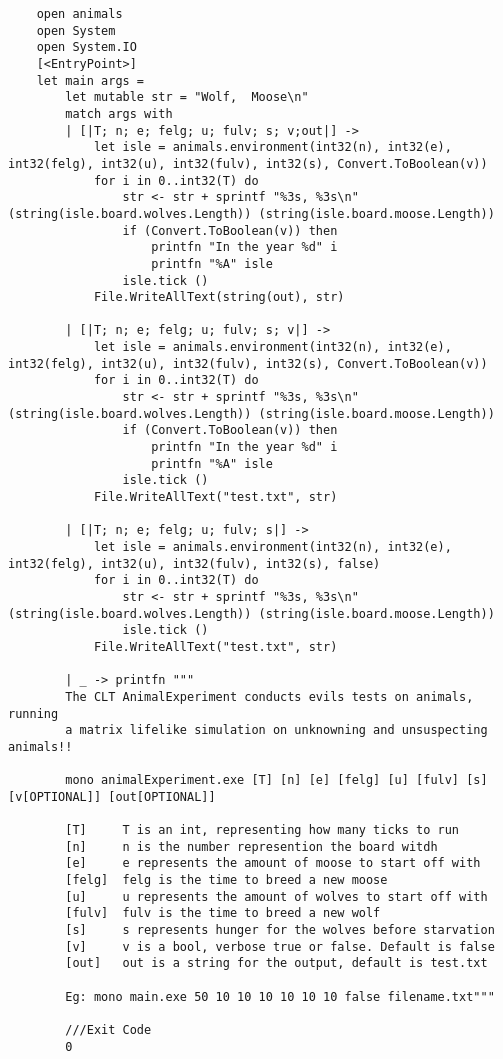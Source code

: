 \begin{lstlisting}
    open animals
    open System
    open System.IO
    [<EntryPoint>]
    let main args =
        let mutable str = "Wolf,  Moose\n"
        match args with
        | [|T; n; e; felg; u; fulv; s; v;out|] ->
            let isle = animals.environment(int32(n), int32(e), int32(felg), int32(u), int32(fulv), int32(s), Convert.ToBoolean(v))
            for i in 0..int32(T) do
                str <- str + sprintf "%3s, %3s\n" (string(isle.board.wolves.Length)) (string(isle.board.moose.Length))
                if (Convert.ToBoolean(v)) then
                    printfn "In the year %d" i
                    printfn "%A" isle
                isle.tick ()
            File.WriteAllText(string(out), str)
        
        | [|T; n; e; felg; u; fulv; s; v|] ->
            let isle = animals.environment(int32(n), int32(e), int32(felg), int32(u), int32(fulv), int32(s), Convert.ToBoolean(v))
            for i in 0..int32(T) do
                str <- str + sprintf "%3s, %3s\n" (string(isle.board.wolves.Length)) (string(isle.board.moose.Length))
                if (Convert.ToBoolean(v)) then
                    printfn "In the year %d" i
                    printfn "%A" isle
                isle.tick ()
            File.WriteAllText("test.txt", str)
        
        | [|T; n; e; felg; u; fulv; s|] ->
            let isle = animals.environment(int32(n), int32(e), int32(felg), int32(u), int32(fulv), int32(s), false)
            for i in 0..int32(T) do
                str <- str + sprintf "%3s, %3s\n" (string(isle.board.wolves.Length)) (string(isle.board.moose.Length))
                isle.tick ()
            File.WriteAllText("test.txt", str)
        
        | _ -> printfn """
        The CLT AnimalExperiment conducts evils tests on animals, running
        a matrix lifelike simulation on unknowning and unsuspecting animals!!
    
        mono animalExperiment.exe [T] [n] [e] [felg] [u] [fulv] [s] [v[OPTIONAL]] [out[OPTIONAL]]
    
        [T]     T is an int, representing how many ticks to run
        [n]     n is the number represention the board witdh
        [e]     e represents the amount of moose to start off with
        [felg]  felg is the time to breed a new moose
        [u]     u represents the amount of wolves to start off with
        [fulv]  fulv is the time to breed a new wolf
        [s]     s represents hunger for the wolves before starvation
        [v]     v is a bool, verbose true or false. Default is false
        [out]   out is a string for the output, default is test.txt
    
        Eg: mono main.exe 50 10 10 10 10 10 10 false filename.txt"""
        
        ///Exit Code
        0


\end{lstlisting}